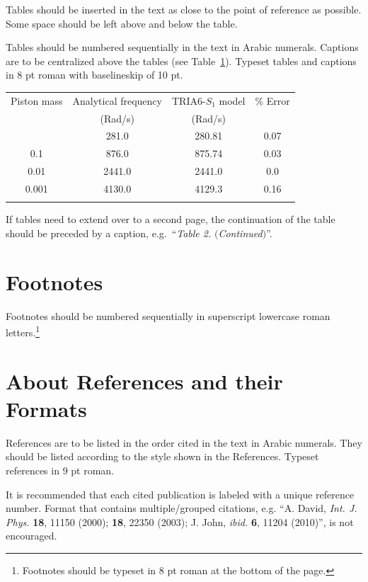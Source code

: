 \documentclass{ws-ijmpa}
\begin{document}
Tables should be inserted in the text as close to the point of
reference as possible. Some space should be left above and below
the table.

Tables should be numbered sequentially in the text in Arabic
numerals. Captions are to be centralized above the tables (see
Table~\ref{ta1}).  Typeset tables and captions in 8 pt roman with
baselineskip of 10 pt.

\begin{table}[ph]
{\begin{tabular}{@{}cccc@{}} \toprule
Piston mass & Analytical frequency & TRIA6-$S_1$ model &
\% Error \\
& (Rad/s) & (Rad/s) \\ \colrule
1.0\hphantom{00} & \hphantom{0}281.0 & \hphantom{0}280.81 & 0.07 \\
0.1\hphantom{00} & \hphantom{0}876.0 & \hphantom{0}875.74 & 0.03 \\
0.01\hphantom{0} & 2441.0 & 2441.0\hphantom{0} & 0.0\hphantom{0} \\
0.001 & 4130.0 & 4129.3\hphantom{0} & 0.16\\ \botrule
\end{tabular} \label{ta1}}
\end{table}

If tables need to extend over to a second page, the continuation of
the table should be preceded by a caption, e.g.~``{\it Table 2.}
$(${\it Continued}$)$''.

\section{Footnotes}

Footnotes should be numbered sequentially in superscript
lowercase roman letters.\footnote{Footnotes should be
typeset in 8 pt roman at the bottom of the page.}

\section{About References and their Formats}

References are to be listed in the order cited in the text in Arabic
numerals. They should be listed according to the style shown in the
References. Typeset references in 9 pt roman.

It is recommended that each cited publication is labeled with a unique reference number. Format that contains multiple/grouped citations, e.g. ``A. David, {\it Int. J. Phys.} {\bf 18}, 11150 (2000); {\bf 18}, 22350 (2003); J. John, {\it ibid.} {\bf 6}, 11204 (2010)'', is not encouraged.
\end{document}

